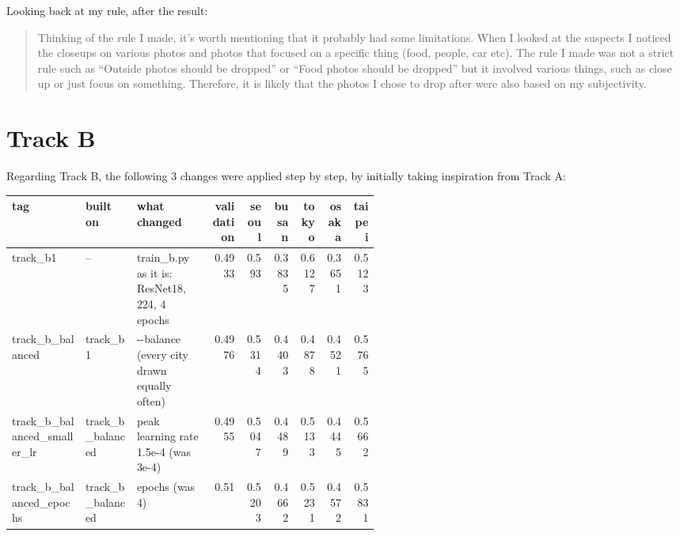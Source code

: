\documentclass[11pt]{article}
\begin{document}
Looking back at my rule, after the result:
\begin{quote}\small
Thinking of the rule I made, it's worth mentioning that it probably had some limitations. When I looked at the suspects I noticed the closeups on various photos and photos that focused on a specific thing (food, people, car etc). The rule I made was not a strict rule such as ``Outside photos should be dropped'' or ``Food photos should be dropped'' but it involved various things, such as close up or just focus on something. Therefore, it is likely that the photos I chose to drop after were also based on my subjectivity.
\end{quote}

\section*{Track B}

Regarding Track B, the following 3 changes were applied step by step, by initially taking inspiration from Track A:

\begin{center}\scriptsize
\begin{tabular}{>{\raggedright\arraybackslash}p{0.2\linewidth}>{\raggedright\arraybackslash}p{0.14\linewidth}>{\raggedright\arraybackslash}p{0.2\linewidth}rrrrrr}
\toprule
tag & built on & what changed & validation & seoul & busan & tokyo & osaka & taipei \\
\midrule
track\_\allowbreak{}b1 & -- & train\_b.py as it is: ResNet18, 224, 4 epochs & 0.4933 & 0.593 & 0.3835 & 0.6127 & 0.3651 & 0.5123 \\
track\_\allowbreak{}b\_\allowbreak{}balanced & track\_\allowbreak{}b1 & -{}-balance (every city drawn equally often) & 0.4976 & 0.5314 & 0.4403 & 0.4878 & 0.4521 & 0.5765 \\
track\_\allowbreak{}b\_\allowbreak{}balanced\_\allowbreak{}smaller\_\allowbreak{}lr & track\_\allowbreak{}b\_\allowbreak{}balanced & peak learning rate 1.5e-4 (was 3e-4) & 0.4955 & 0.5047 & 0.4489 & 0.5133 & 0.4445 & 0.5662 \\
track\_\allowbreak{}b\_\allowbreak{}balanced\_\allowbreak{}epochs & track\_\allowbreak{}b\_\allowbreak{}balanced & 6 epochs (was 4) & 0.51 & 0.5203 & 0.4662 & 0.5231 & 0.4572 & 0.5831 \\
\bottomrule
\end{tabular}
\end{center}
\end{document}

